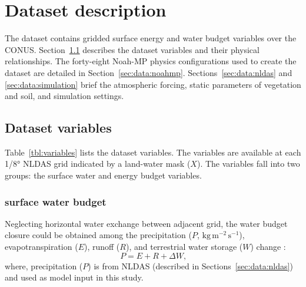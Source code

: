 \documentclass[essd]{copernicus}
\begin{document}
\section{Dataset description}\label{sec:data}

The dataset contains gridded surface energy and water budget variables over the
CONUS. Section~\ref{sec:data:variables} describes the dataset variables and
their physical relationships. The forty-eight Noah-MP physics configurations
used to create the dataset are detailed in Section~\ref{sec:data:noahmp}.
Sections~\ref{sec:data:nldas} and \ref{sec:data:simulation} brief the
atmospheric forcing, static parameters of vegetation and soil, and simulation
settings.


\subsection{Dataset variables}\label{sec:data:variables}

Table~\ref{tbl:variables} lists the dataset variables. The variables are
available at each 1/8° NLDAS grid indicated by a land-water mask
(\(X\)). The variables fall into two groups: the surface water and energy budget
variables.



\subsubsection{surface water budget}

Neglecting horizontal water exchange between adjacent grid, the water budget
closure could be obtained among the precipitation (\(P\),
\(\mathrm{kg\,m^{-2}\,s^{-1}}\)), evapotranspiration (\(E\)), runoff (\(R\)),
and terrestrial water storage (\(W\)) change \citep{zheng2020JAMES}:
\begin{equation}
    P = E + R + \Delta W \text{,}
\end{equation}
where, precipitation (\(P\)) is from NLDAS (described in
Sections~\ref{sec:data:nldas}) and used as model input in this study.
\end{document}
